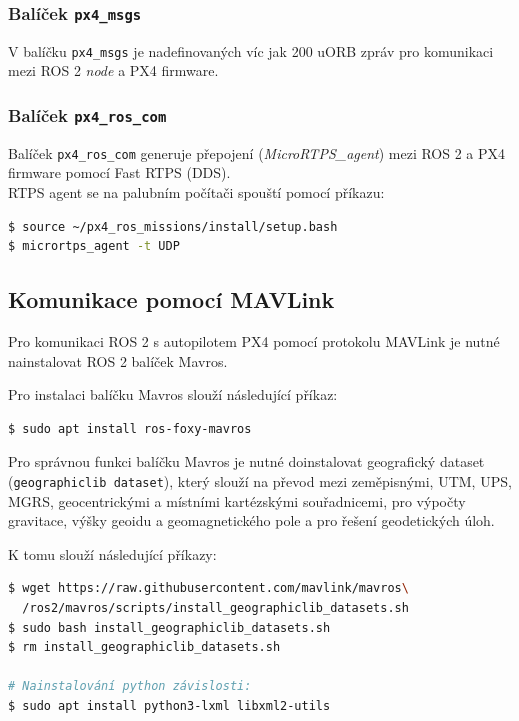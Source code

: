 \subsubsection{Balíček \texttt{px4\_msgs}}

V balíčku \texttt{px4\_msgs} je nadefinovaných víc jak 200 uORB zpráv pro komunikaci mezi ROS 2 \textit{node} a PX4 firmware.

\subsubsection{Balíček \texttt{px4\_ros\_com}}

Balíček \texttt{px4\_ros\_com} generuje přepojení (\textit{MicroRTPS\_agent}) mezi ROS 2 a PX4 firmware pomocí Fast RTPS (\acs{DDS}).\\

\acs{RTPS} agent se na palubním počítači spouští pomocí příkazu:

\begin{lstlisting}[language=bash]
$ source ~/px4_ros_missions/install/setup.bash
$ micrortps_agent -t UDP
\end{lstlisting}

\subsection{Komunikace pomocí MAVLink}

Pro komunikaci ROS 2 s autopilotem PX4 pomocí protokolu MAVLink je nutné nainstalovat ROS 2 balíček Mavros.

Pro instalaci balíčku Mavros slouží následující příkaz:

\begin{lstlisting}[language=bash]
$ sudo apt install ros-foxy-mavros
\end{lstlisting}

Pro správnou funkci balíčku Mavros je nutné doinstalovat geografický dataset (\texttt{geographiclib dataset}), který slouží na převod mezi zeměpisnými, UTM, UPS, MGRS, geocentrickými a místními kartézskými souřadnicemi, pro výpočty gravitace, výšky geoidu a geomagnetického pole a pro řešení geodetických úloh. \cite{GEOLIB}

K tomu slouží následující příkazy:

\begin{lstlisting}[language=bash]
$ wget https://raw.githubusercontent.com/mavlink/mavros\
  /ros2/mavros/scripts/install_geographiclib_datasets.sh
$ sudo bash install_geographiclib_datasets.sh
$ rm install_geographiclib_datasets.sh

# Nainstalování python závislosti:
$ sudo apt install python3-lxml libxml2-utils
\end{lstlisting}
